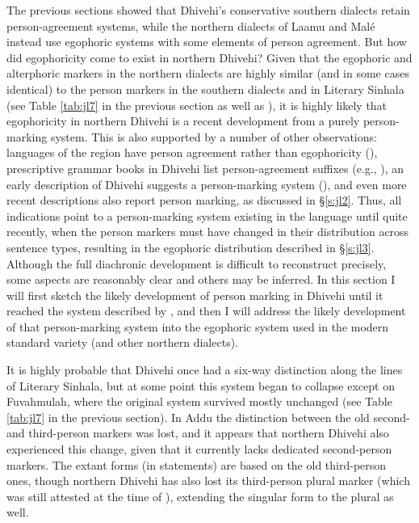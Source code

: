 \documentclass[output=paper]{langsci/langscibook}
\begin{document}
The previous sections showed that Dhivehi’s conservative southern dialects retain person-agreement systems, while the northern dialects of Laamu and Malé instead use egophoric systems with some elements of person agreement. But how did egophoricity come to exist in northern Dhivehi? Given that the egophoric and alterphoric markers in the northern dialects are highly similar (and in some cases identical) to the person markers in the southern dialects and in Literary Sinhala (see Table \ref{tab:jl7} in the previous section as well as \citealt[168–175]{Fritz2002}), it is highly likely that egophoricity in northern Dhivehi is a recent development from a purely person-marking system. This is also supported by a number of other observations: languages of the region have person agreement rather than egophoricity (\citealt{Hock2016}), prescriptive grammar books in Dhivehi list person-agreement suffixes (e.g., \citealt{Ahmad1970}), an early description of Dhivehi suggests a person-marking system (\citealt{Geiger1919}), and even more recent descriptions also report person marking, as discussed in §‎\ref{s:jl2}. Thus, all indications point to a person-marking system existing in the language until quite recently, when the person markers must have changed in their distribution across sentence types, resulting in the egophoric distribution described in §\ref{s:jl3}. Although the full diachronic development is difficult to reconstruct precisely, some aspects are reasonably clear and others may be inferred. In this section I will first sketch the likely development of person marking in Dhivehi until it reached the system described by \cite{Ahmad1970}, and then I will address the likely development of that person-marking system into the egophoric system used in the modern standard variety (and other northern dialects).


It is highly probable that Dhivehi once had a six-way distinction along the lines of Literary Sinhala, but at some point this system began to collapse except on Fuvahmulah, where the original system survived mostly unchanged (see Table \ref{tab:jl7} in the previous section). In Addu the distinction between the old second- and third-person markers was lost, and it appears that northern Dhivehi also experienced this change, given that it currently lacks dedicated second-person markers. The extant forms (in statements) are based on the old third-person ones, though northern Dhivehi has also lost its third-person plural marker (which was still attested at the time of \citealt{Geiger1919}), extending the singular form to the plural as well. 
\end{document}
